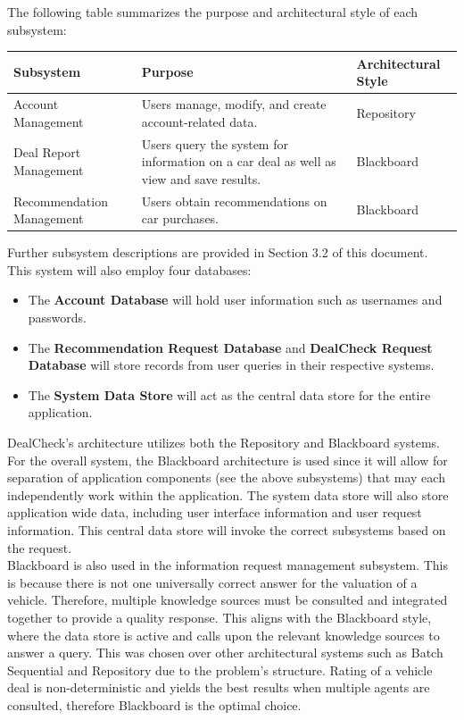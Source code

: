 \documentclass[]{article}
\begin{document}
The following table summarizes the purpose and architectural style of each subsystem:
\FloatBarrier
\begin{table}[H]
    \centering
    \begin{tabular}{|p{4cm}|p{7cm}|p{3cm}|}
        \hline
        \textbf{Subsystem} & \textbf{Purpose} & \textbf{Architectural Style} \\
        \hline
        Account Management & Users manage, modify, and create account-related data. & Repository \\
        \hline
        Deal Report Management & Users query the system for information on a car deal as well as view and save results. & Blackboard \\
        \hline
        Recommendation Management & Users obtain recommendations on car purchases. & Blackboard \\
        \hline
    \end{tabular}
    \label{tab:dealcheck_subsystems}
\end{table}
\FloatBarrier
\noindent
Further subsystem descriptions are provided in Section 3.2 of this document. \\
\newline
This system will also employ four databases:
\begin{itemize}
    \item The \textbf{Account Database} will hold user information such as usernames and passwords.
    \item The \textbf{Recommendation Request Database} and \textbf{DealCheck Request Database} will store records from user queries in their respective systems.
    \item The \textbf{System Data Store} will act as the central data store for the entire application.
\end{itemize}

DealCheck’s architecture utilizes both the Repository and Blackboard systems. For the overall system, the Blackboard architecture is used since it will allow for separation of application components (see the above subsystems) that may each independently work within the application. The system data store will also store application wide data, including user interface information and user request information. This central data store will invoke the correct subsystems based on the request. \\

Blackboard is also used in the information request management subsystem. This is because there is not one universally correct answer for the valuation of a vehicle. Therefore, multiple knowledge sources must be consulted and integrated together to provide a quality response. This aligns with the Blackboard style, where the data store is active and calls upon the relevant knowledge sources to answer a query. This was chosen over other architectural systems such as Batch Sequential and Repository due to the problem’s structure. Rating of a vehicle deal is non-deterministic and yields the best results when multiple agents are consulted, therefore Blackboard is the optimal choice.\\
\end{document}
